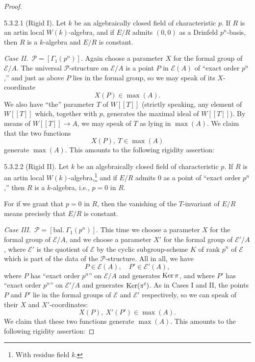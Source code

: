 \begin{proof}
\begin{pitemnum}{5.3.2.1}\label{lem:5.3.2.1}
(Rigid I). Let $k$ be an algebraically closed field of characteristic $p$. If $R$ is an artin local $W(k)$-algebra, and if $E/R$ admits $(0,0)$ as a Drinfeld $p^n$-basis, then $R$ is a $k$-algebra and $E/R$ is constant.
\end{pitemnum}

\medskip
\noindent\emph{Case II.}\ $\mathcal{P} = [\Gamma_1(p^n)]$. Again choose a parameter $X$ for the formal group of $\mathcal{E}/A$. The universal $\mathcal{P}$-structure on $\mathcal{E}/A$ is a point $P$ in $\mathcal{E}(A)$ of ``exact order $p^n$,'' and just as above $P$ lies in the formal group, so we may speak of its $X$-coordinate
\[
X(P) \in \max(A).
\]
We also have ``the'' parameter $T$ of $W[[T]]$ (strictly speaking, any element of $W[[T]]$ which, together with $p$, generates the maximal ideal of $W[[T]]$). By means of $W[[T]] \to A$, we may speak of $T$ as lying in $\max(A)$. We claim that the two functions
\[
X(P),\ T \in \max(A)
\]
generate $\max(A)$. This amounts to the following rigidity assertion:

\begin{pitemnum}{5.3.2.2}\label{lem:5.3.2.2}
(Rigid II). Let $k$ be an algebraically closed field of characteristic $p$. If $R$ is an artin local $W(k)$-algebra,\footnote{With residue field $k$.} and if $E/R$ admits $0$ as a point of ``exact order $p^n$,'' then $R$ is a $k$-algebra, i.e., $p = 0$ in $R$.
\end{pitemnum}

For if we grant that $p = 0$ in $R$, then the vanishing of the $T$-invariant of $E/R$ means precisely that $E/R$ is constant.

\medskip
\noindent\emph{Case III.}\ $\mathcal{P} = [\mathrm{bal.}\ \Gamma_1(p^n)]$. This time we choose a parameter $X$ for the formal group of $\mathcal{E}/A$, and we choose a parameter $X'$ for the formal group of $\mathcal{E}'/A$, where $\mathcal{E}'$ is the quotient of $\mathcal{E}$ by the cyclic subgroup-scheme $K$ of rank $p^n$ of $\mathcal{E}$ which is part of the data of the $\mathcal{P}$-structure. All in all, we have
\[
P \in \mathcal{E}(A),\quad P' \in \mathcal{E}'(A),
\]
where $P$ has ``exact order $p^n$'' on $\mathcal{E}/A$ and generates $\operatorname{Ker} \pi$, and where $P'$ has ``exact order $p^n$'' on $\mathcal{E}'/A$ and generates $\operatorname{Ker}(\pi^t)$. As in Cases I and II, the points $P$ and $P'$ lie in the formal groups of $\mathcal{E}$ and $\mathcal{E}'$ respectively, so we can speak of their $X$ and $X'$-coordinates:
\[
X(P),\ X'(P') \in \max(A).
\]
We claim that these two functions generate $\max(A)$. This amounts to the following rigidity assertion:


\end{proof}
